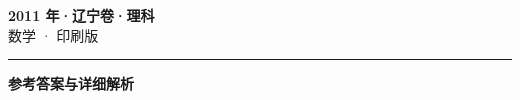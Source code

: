\documentclass[zihao=5, a4paper]{ctexart}
\begin{document}
\begin{center}
  {\Large\bfseries 2011 年·辽宁卷·理科}\\[4pt]
  {\large 数学 · 印刷版}
\end{center}
\medskip
{}

\par\bigskip\hrule\bigskip
{}
\begin{center}{\large\bfseries 参考答案与详细解析}\end{center}
\smallskip

\end{document}
